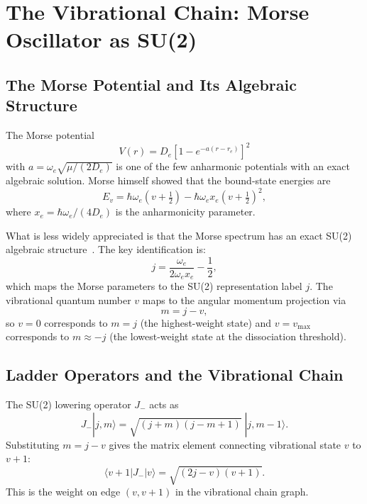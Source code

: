 \documentclass[aps,pra,twocolumn,superscriptaddress,longbibliography]{revtex4-2}
\begin{document}
\section{The Vibrational Chain: Morse Oscillator as SU(2)}
\label{sec:vibrational}

\subsection{The Morse Potential and Its Algebraic Structure}

The Morse potential
\begin{equation}
V(r) = D_e\left[1 - e^{-a(r - r_e)}\right]^2
\label{eq:morse}
\end{equation}
with $a = \omega_e\sqrt{\mu/(2D_e)}$ is one of the few anharmonic
potentials with an exact algebraic solution.  Morse himself showed that
the bound-state energies are
\begin{equation}
E_v = \hbar\omega_e\left(v + \tfrac{1}{2}\right) -
\hbar\omega_e x_e\left(v + \tfrac{1}{2}\right)^2,
\label{eq:morse_spectrum}
\end{equation}
where $x_e = \hbar\omega_e/(4D_e)$ is the anharmonicity parameter.

What is less widely appreciated is that the Morse spectrum has an exact
SU(2) algebraic structure~\cite{frank_lemus,alhassid_gursey}.  The key
identification is:
\begin{equation}
j = \frac{\omega_e}{2\omega_e x_e} - \frac{1}{2},
\label{eq:j_def}
\end{equation}
which maps the Morse parameters to the SU(2) representation label $j$.
The vibrational quantum number $v$ maps to the angular momentum
projection via
\begin{equation}
m = j - v,
\label{eq:m_from_v}
\end{equation}
so $v = 0$ corresponds to $m = j$ (the highest-weight state) and
$v = v_{\max}$ corresponds to $m \approx -j$ (the lowest-weight state at
the dissociation threshold).

\subsection{Ladder Operators and the Vibrational Chain}

The SU(2) lowering operator $J_-$ acts as
\begin{equation}
J_-|j, m\rangle = \sqrt{(j+m)(j-m+1)}\;|j, m-1\rangle.
\label{eq:jminus}
\end{equation}
Substituting $m = j - v$ gives the matrix element connecting vibrational
state $v$ to $v + 1$:
\begin{equation}
\langle v+1|J_-|v\rangle = \sqrt{(2j - v)(v + 1)}.
\label{eq:vib_ladder}
\end{equation}
This is the weight on edge $(v, v+1)$ in the vibrational chain graph.
\end{document}
